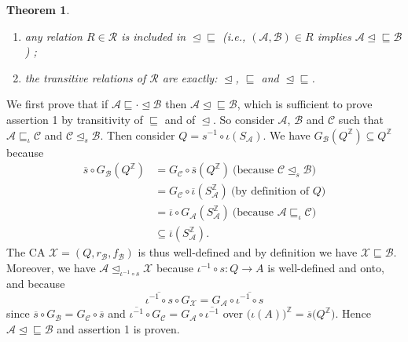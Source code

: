 \documentclass[a4paper]{elsarticle}
\newcommand{\ZZ}{\mathbb{Z}}
\newcommand{\ACA}{\mathcal{A}}
\newcommand{\ACB}{\mathcal{B}}
\newcommand{\ACC}{\mathcal{C}}
\newcommand{\ACX}{\mathcal{X}}
\newcommand{\locB}{f_{\ACB}}
\newcommand{\globA}{G_{\ACA}}
\newcommand{\globB}{G_{\ACB}}
\newcommand{\globC}{G_{\ACC}}
\newcommand{\globX}{G_{\ACX}}
\newcommand\alphabe[1]{S_{#1}}
\newcommand{\alphA}{\alphabe{\ACA}}
\newcommand{\radB}{r_{\ACB}}
\newcommand{\unif}{\overline}
\newcommand\sac{\sqsubseteq}
\newcommand{\fac}{\trianglelefteq}
\newcommand{\facby}[1]{\trianglelefteq_{#1}}
\newcommand{\facsac}{\fac\!\sac}
\newcommand{\locrelset}{\mathcal{R}}
\newtheorem{thm}{Theorem}[section]
\begin{document}
\begin{thm}
  \label{thm:locrel}
  \par\noindent
  \begin{enumerate}
  \item any relation $R\in\locrelset$ is included in $\facsac$
    (\textit{i.e., }${(\ACA,\ACB)\in R}$ implies ${\ACA\facsac\ACB}$) ;
  \item the transitive relations of $\locrelset$ are exactly: $\fac$,
    $\sac$ and $\facsac$.
  \end{enumerate}
\end{thm}
\begin{pf}
  We first prove that if ${\ACA\sac\cdot\fac\ACB}$ then
  ${\ACA\facsac\ACB}$, which is sufficient to prove assertion 1 by
  transitivity of $\sac$ and of $\fac$.  So consider $\ACA$, $\ACB$
  and $\ACC$ such that ${\ACA\sac_\iota\ACC}$ and
  ${\ACC\fac_s\ACB}$. Then consider $Q=s^{-1}\circ \iota(\alphA)$. We
  have ${\globB(Q^\ZZ)\subseteq Q^\ZZ}$ because
  \newcommand\cmtinproof[1]{\ \text{(#1)}}
  \begin{align*}
    \unif{s}\circ\globB(Q^\ZZ) &= \globC\circ\unif{s}(Q^\ZZ)\cmtinproof{because $\ACC\fac_s\ACB$}\\ &=
    \globC\circ\unif{\iota}(\alphA^\ZZ)\cmtinproof{by definition of $Q$}\\ &=
    \unif{\iota}\circ\globA(\alphA^\ZZ)\cmtinproof{because ${\ACA\sac_\iota\ACC}$}\\ &\subseteq \unif{\iota}
    (\alphA^\ZZ).
  \end{align*}
The CA $\ACX = (Q, \radB, \locB)$
  is thus well-defined and by definition we have
  ${\ACX\sac\ACB}$. Moreover, we have ${\ACA\facby{\iota^{-1}\circ
      s}\ACX}$ because ${\iota^{-1}\circ s : Q \rightarrow A}$ is
  well-defined and onto, and because
  \[\unif{\iota^{-1}\circ s}\circ\globX = \globA \circ\unif{\iota^{-1}\circ s}\]
  since ${\unif{s}\circ\globB = \globC\circ\unif{s}}$ and
  ${\unif{\iota^{-1}}\circ\globC = \globA\circ\unif{\iota^{-1}}}$ over
  ${\bigl(\iota(A)\bigr)^\ZZ = \unif{s}\bigl(Q^\ZZ\bigr)}$.  Hence
  ${\ACA\facsac\ACB}$ and assertion 1 is proven.


\end{pf}
\end{document}
